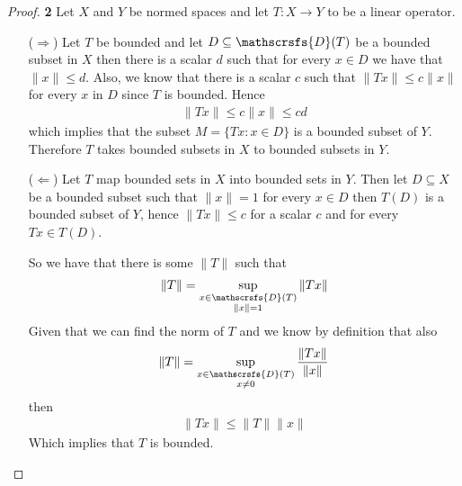 \documentclass[11pt]{article}
\newcommand{\dom}{\mathscrsfs{D}}
\theoremstyle{definition}
\begin{document}
\begin{proof}{\textbf{2}}
    Let $X$ and $Y$ be normed spaces and let $T:X \to Y$ to be a linear
    operator.
    \begin{itemize}
        \item [($\Rightarrow$)] Let $T$ be bounded and let $D\subseteq \dom(T)$
        be a bounded subset in $X$ then there is a scalar $d$ such that
        for every $x \in D$ we have that $\|x\| \leq d$. Also, we know that
        there is a scalar $c$ such that $\|Tx\| \leq c\|x\|$ for every $x$ in
        $D$ since $T$ is bounded. Hence
        \begin{align*}
            \|Tx\| \leq c\|x\| \leq cd
        \end{align*}
        which implies that the subset $M = \{Tx: x \in D\}$ is a bounded subset
        of $Y$. Therefore $T$ takes bounded subsets in $X$ to bounded subsets
        in $Y$.
        \item [($\Leftarrow$)] Let $T$ map bounded sets in $X$ into bounded
        sets in $Y$. Then let $D \subseteq X$ be a bounded subset such that
        $\|x\| = 1$ for every $x \in D$ then $T(D)$ is a bounded subset of $Y$,
        hence $\|Tx\| \leq c$ for a scalar $c$ and for every $Tx \in T(D)$.
        
        So we have that there is some $\|T\|$ such that
        \begin{align*}
            \|T\| = \sup_{\substack{x \in \dom(T)\\ \|x\| = 1}} \|Tx\|
        \end{align*}
        Given that we can find the norm of $T$ and we know by definition that
        also
        \begin{align*}
            \|T\| = \sup_{\substack{x \in \dom(T)\\ x \neq 0}} \frac{\|Tx\|}{\|x\|}
        \end{align*}
        then
        \begin{align*}
            \|Tx\| \leq \|T\|\|x\|
        \end{align*}
        Which implies that $T$ is bounded.
    \end{itemize}
\end{proof}
\cleardoublepage
\end{document}

